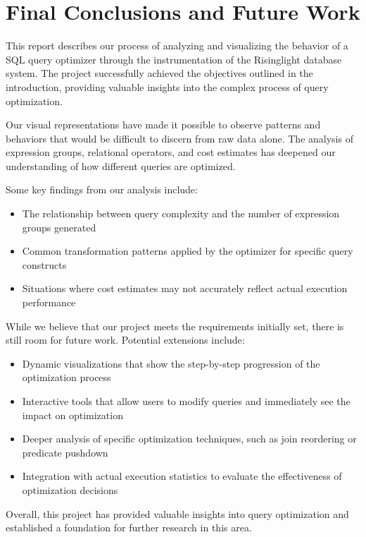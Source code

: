 \documentclass[a4paper,12pt]{scrreprt}
\begin{document}
\chapter{Final Conclusions and Future Work} \label{chap:concl}
\thispagestyle{fancy}
This report describes our process of analyzing and visualizing the behavior of a SQL query optimizer through the instrumentation of the Risinglight database system. The project successfully achieved the objectives outlined in the introduction, providing valuable insights into the complex process of query optimization.

Our visual representations have made it possible to observe patterns and behaviors that would be difficult to discern from raw data alone. The analysis of expression groups, relational operators, and cost estimates has deepened our understanding of how different queries are optimized.

Some key findings from our analysis include:
\begin{itemize}
    \item The relationship between query complexity and the number of expression groups generated
    \item Common transformation patterns applied by the optimizer for specific query constructs
    \item Situations where cost estimates may not accurately reflect actual execution performance
\end{itemize}

While we believe that our project meets the requirements initially set, there is still room for future work. Potential extensions include:
\begin{itemize}
    \item Dynamic visualizations that show the step-by-step progression of the optimization process
    \item Interactive tools that allow users to modify queries and immediately see the impact on optimization
    \item Deeper analysis of specific optimization techniques, such as join reordering or predicate pushdown
    \item Integration with actual execution statistics to evaluate the effectiveness of optimization decisions
\end{itemize}

Overall, this project has provided valuable insights into query optimization and established a foundation for further research in this area.
\end{document}
